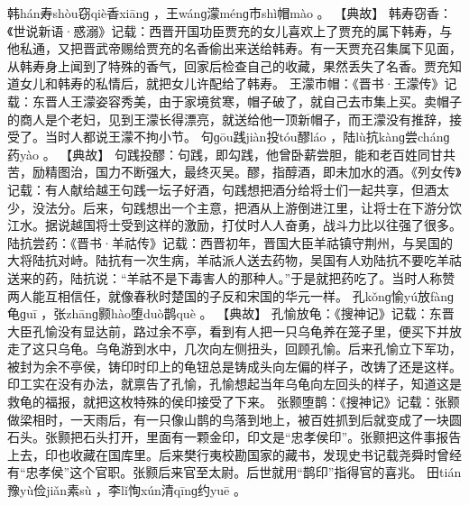 \documentclass[12pt,UTF8]{ctexbook}
\begin{document}
韩hán寿shòu窃qiè香xiānɡ
，王wánɡ濛ménɡ市shì帽mào
。
【典故】
韩寿窃香：《世说新语·惑溺》记载：西晋开国功臣贾充的女儿喜欢上了贾充的属下韩寿，与他私通，又把晋武帝赐给贾充的名香偷出来送给韩寿。有一天贾充召集属下见面，从韩寿身上闻到了特殊的香气，回家后检查自己的收藏，果然丢失了名香。贾充知道女儿和韩寿的私情后，就把女儿许配给了韩寿。
王濛市帽：《晋书·王濛传》记载：东晋人王濛姿容秀美，由于家境贫寒，帽子破了，就自己去市集上买。卖帽子的商人是个老妇，见到王濛长得漂亮，就送给他一顶新帽子，而王濛没有推辞，接受了。当时人都说王濛不拘小节。
句ɡōu践jiàn投tóu醪láo
，陆lù抗kànɡ尝chánɡ药yào
。
【典故】
句践投醪：句践，即勾践，他曾卧薪尝胆，能和老百姓同甘共苦，励精图治，国力不断强大，最终灭吴。醪，指醇酒，即未加水的酒。《列女传》记载：有人献给越王句践一坛子好酒，句践想把酒分给将士们一起共享，但酒太少，没法分。后来，句践想出一个主意，把酒从上游倒进江里，让将士在下游分饮江水。据说越国将士受到这样的激励，打仗时人人奋勇，战斗力比以往强了很多。
陆抗尝药：《晋书·羊祜传》记载：西晋初年，晋国大臣羊祜镇守荆州，与吴国的大将陆抗对峙。陆抗有一次生病，羊祜派人送去药物，吴国有人劝陆抗不要吃羊祜送来的药，陆抗说：“羊祜不是下毒害人的那种人。”于是就把药吃了。当时人称赞两人能互相信任，就像春秋时楚国的子反和宋国的华元一样。
孔kǒnɡ愉yú放fànɡ龟ɡuī
，张zhānɡ颢hào堕duò鹊què
。
【典故】
孔愉放龟：《搜神记》记载：东晋大臣孔愉没有显达前，路过余不亭，看到有人把一只乌龟养在笼子里，便买下并放走了这只乌龟。乌龟游到水中，几次向左侧扭头，回顾孔愉。后来孔愉立下军功，被封为余不亭侯，铸印时印上的龟钮总是铸成头向左偏的样子，改铸了还是这样。印工实在没有办法，就禀告了孔愉，孔愉想起当年乌龟向左回头的样子，知道这是救龟的福报，就把这枚特殊的侯印接受了下来。
张颢堕鹊：《搜神记》记载：张颢做梁相时，一天雨后，有一只像山鹊的鸟落到地上，被百姓抓到后就变成了一块圆石头。张颢把石头打开，里面有一颗金印，印文是“忠孝侯印”。张颢把这件事报告上去，印也收藏在国库里。后来樊行夷校勘国家的藏书，发现史书记载尧舜时曾经有“忠孝侯”这个官职。张颢后来官至太尉。后世就用“鹊印”指得官的喜兆。
田tián豫yù俭jiǎn素sù
，李lǐ恂xún清qīnɡ约yuē
。
\end{document}
